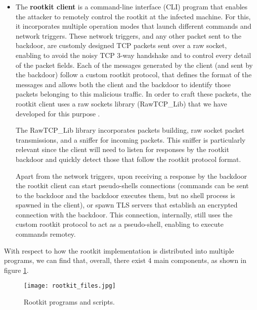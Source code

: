 \begin{itemize}
\item The \textbf{rootkit client} is a command-line interface (CLI) program that enables the attacker to remotely control the rootkit at the infected machine. For this, it incorporates multiple operation modes that launch different commands and network triggers. These network triggers, and any other packet sent to the backdoor, are customly designed TCP packets sent over a raw socket, enabling to avoid the noisy TCP 3-way handshake and to control every detail of the packet fields. Each of the messages generated by the client (and sent by the backdoor) follow a custom rootkit protocol, that defines the format of the messages and allows both the client and the backdoor to identify those packets belonging to this malicious traffic. In order to craft these packets, the rootkit client uses a raw sockets library (RawTCP\_Lib) that we have developed for this purpose \cite{rawtcp_lib}.

The RawTCP\_Lib library incorporates packets building, raw socket packet transmissions, and a sniffer for incoming packets. This sniffer is particularly relevant since the client will need to listen for responses by the rootkit backdoor and quickly detect those that follow the rootkit protocol format.

Apart from the network triggers, upon receiving a response by the backdoor the rootkit client can start pseudo-shells connections (commands can be sent to the backdoor and the backdoor executes them, but no shell process is spawned in the client), or spawn TLS servers that establish an encrypted connection with the backdoor. This connection, internally, still uses the custom rootkit protocol to act as a pseudo-shell, enabling to execute commands remotey.
\end{itemize}


With respect to how the rootkit implementation is distributed into multiple programs, we can find that, overall, there exist 4 main components, as shown in figure \ref{fig:rootkit_files}.

\begin{figure}[htbp]
	\centering
	\texttt{[image: rootkit\_files.jpg]}
	\caption{Rootkit programs and scripts.}
	\label{fig:rootkit_files}
\end{figure}

